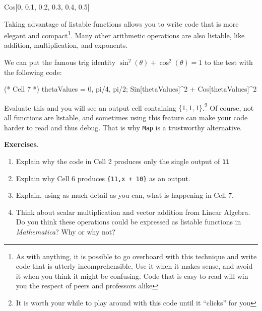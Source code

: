 \begin{code}
	   Cos[{0, 0.1, 0.2, 0.3, 0.4, 0.5}]
\end{code}

Taking advantage of listable functions allows you to write code that is more elegant and compact\footnote{As with anything, it is possible to go overboard with this technique and write code that is utterly incomprehensible. Use it when it makes sense, and avoid it when you think it might be confusing. Code that is easy to read will win you the respect of peers and professors alike}. Many other arithmetic operations are also listable, like addition, multiplication, and exponents. 

We can put the famous trig identity $\sin^2(\theta) + \cos^2(\theta) = 1$ to the test with the following code:

\begin{code}
	   (* Cell 7 *)
	   thetaValues = {0, pi/4, pi/2};
	   Sin[thetaValues]^2 + Cos[thetaValues]^2
\end{code}

Evaluate this and you will see an output cell containing $\{1,1,1\}$.\footnote{It is worth your while to play around with this code until it ``clicks'' for you} Of course, not all functions are listable, and sometimes using this feature can make your code harder to read and thus debug. That is why \texttt{Map} is a trustworthy alternative. 

{\bf Exercises}. 
\begin{enumerate}
	   \item Explain why the code in Cell 2 produces only the single output of \texttt{11}
	   \item Explain why Cell 6 produces \texttt{\{11,x + 10\}} as an output.
	   \item Explain, using as much detail as you can, what is happening in Cell 7.
	   \item Think about scalar multiplication and vector addition from Linear Algebra. Do you think these operations could be expressed as listable functions in \emph{Mathematica}? Why or why not?
\end{enumerate}
